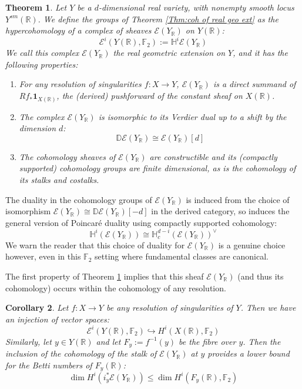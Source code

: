 \documentclass{amsart}
\newtheorem{thm}{Theorem}[section]
\newtheorem{cor}[thm]{Corollary}
\theoremstyle{definition}
\theoremstyle{remark}
\begin{document}
\begin{thm}\label{Thm:Real geo extension}
   Let $Y$ be a $d$-dimensional real variety, with nonempty smooth locus $Y^{sm}(\mathbb{R})$. We define the groups of Theorem \ref{Thm:coh of real geo ext} as the hypercohomology of a complex of sheaves $\mathscr{E}(Y_\mathbb{R})$ on $Y(\mathbb{R})$:\[\mathscr{E}^i(Y(\mathbb{R}),\mathbb{F}_2):=\mathbb{H}^i\mathscr{E}(Y_\mathbb{R})\]
   We call this complex $\mathscr{E}(Y_\mathbb{R})$ the real geometric extension on $Y$, and it has the following properties:

\begin{enumerate}
    \item For any resolution of singularities $f:X\to Y$, $\mathscr{E}(Y_\mathbb{R})$ is a direct summand of $Rf_*\mathbf{1}_{X(\mathbb{R})}$, the (derived) pushforward of the constant sheaf on $X(\mathbb{R})$.
    \item The complex $\mathscr{E}(Y_\mathbb{R})$ is isomorphic to its Verdier dual up to a shift by the dimension $d$:
    \[\mathbb{D}\mathscr{E}(Y_\mathbb{R})\cong \mathscr{E}(Y_\mathbb{R})[d]\]
    \item The cohomology sheaves of $\mathscr{E}(Y_\mathbb{R})$ are constructible and its (compactly supported) cohomology groups are finite dimensional, as is the cohomology of its stalks and costalks.
\end{enumerate}
\end{thm}

The duality in the cohomology groups of $\mathscr{E}(Y_\mathbb{R})$ is induced from the choice of isomorphism $\mathscr{E}(Y_\mathbb{R})\cong \mathbb{D}\mathscr{E}(Y_\mathbb{R})[-d]$ in the derived category, so induces the general version of Poincaré duality using compactly supported cohomology:
\[\mathbb{H}^i(\mathscr{E}(Y_\mathbb{R}))\cong \mathbb{H}^{d-i}_c(\mathscr{E}(Y_\mathbb{R}))^\vee\]
We warn the reader that this choice of duality for $\mathscr{E}(Y_\mathbb{R})$ is a genuine choice however, even in this $\mathbb{F}_2$ setting where fundamental classes are canonical.

The first property of Theorem \ref{Thm:Real geo extension} implies that this sheaf $\mathscr{E}(Y_\mathbb{R})$ (and thus its cohomology) occurs within the cohomology of any resolution.

\begin{cor}\label{Cor:fibre minimality}
Let $f:X\to Y$ be any resolution of singularities of $Y$. Then we have an injection of vector spaces:\[\mathscr{E}^i(Y(\mathbb{R}),\mathbb{F}_2)\hookrightarrow H^i(X(\mathbb{R}),\mathbb{F}_2)\]
Similarly, let $y\in Y(\mathbb{R})$ and let $F_y:=f^{-1}(y)$ be the fibre over $y$. Then the inclusion of the cohomology of the stalk of $\mathscr{E}(Y_\mathbb{R})$ at $y$ provides a lower bound for the Betti numbers of $F_y(\mathbb{R})$:
\[\dim H^i(i_y^* \mathscr{E}(Y_\mathbb{R}))\leq \dim H^i(F_y(\mathbb{R}),\mathbb{F}_2)\]
\end{cor}
\end{document}

